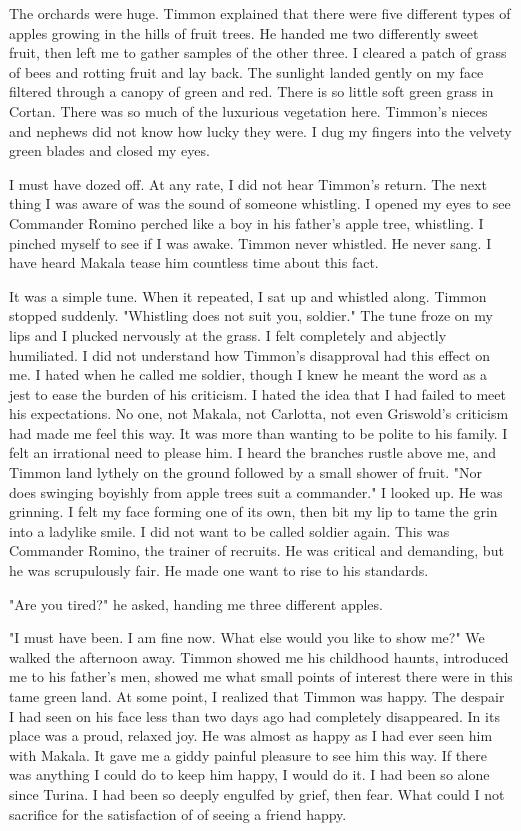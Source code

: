 \documentclass{article}
\begin{document}
The orchards were huge. Timmon explained that there were five different types of apples growing in the hills of fruit trees. He handed me two differently sweet fruit, then left me to gather samples of the other three. I cleared a patch of grass of bees and rotting fruit and lay back. The sunlight landed gently on my face filtered through a canopy of green and red. There is so little soft green grass in Cortan. There was so much of the luxurious vegetation here. Timmon's nieces and nephews did not know how lucky they were. I dug my fingers into the velvety green blades and closed my eyes. 

I must have dozed off. At any rate, I did not hear Timmon's return. The next thing I was aware of was the sound of someone whistling. I opened my eyes to see Commander Romino perched like a boy in his father's apple tree, whistling. I pinched myself to see if I was awake. Timmon never whistled. He never sang. I have heard Makala tease him countless time about this fact.

It was a simple tune. When it repeated, I sat up and whistled along. Timmon stopped suddenly. "Whistling does not suit you, soldier." The tune froze on my lips and I plucked nervously at the grass. I felt completely and abjectly humiliated. I did not understand how Timmon's disapproval had this effect on me. I hated when he called me soldier, though I knew he meant the word as a jest to ease the burden of his criticism. I hated the idea that I had failed to meet his expectations. No one, not Makala, not Carlotta, not even Griswold's criticism had made me feel this way. It was more than wanting to be polite to his family. I felt an irrational need to please him. I heard the branches rustle above me, and Timmon land lythely on the ground followed by a small shower of fruit. "Nor does swinging boyishly from apple trees suit a commander." I looked up. He was grinning. I felt my face forming one of its own, then bit my lip to tame the grin into a ladylike smile. I did not want to be called soldier again. This was Commander Romino, the trainer of recruits. He was critical and demanding, but he was scrupulously fair. He made one want to rise to his standards.

"Are you tired?" he asked, handing me three different apples.

"I must have been. I am fine now. What else would you like to show me?" We walked the afternoon away. Timmon showed me his childhood haunts, introduced me to his father's men, showed me what small points of interest there were in this tame green land. At some point, I realized that Timmon was happy. The despair I had seen on his face less than two days ago had completely disappeared. In its place was a proud, relaxed joy. He was almost as happy as I had ever seen him with Makala. It gave me a giddy painful pleasure to see him this way. If there was anything I could do to keep him happy, I would do it. I had been so alone since Turina. I had been so deeply engulfed by grief, then fear. What could I not sacrifice for the satisfaction of of seeing a friend happy.
\end{document}
